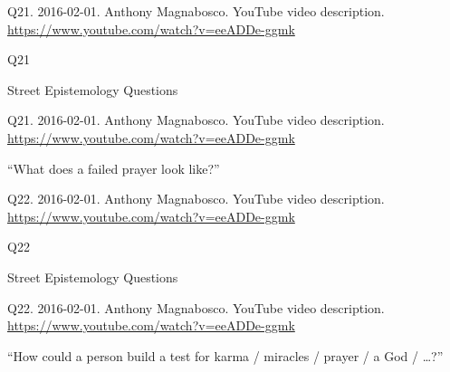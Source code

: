 \documentclass[
    src/templates/5x2-on-a4paper,
    frame
]{flashcards}
\newcommand{\myheader}{}
\newcommand{\myfooter}{
    \begin{flushright}
        \small\sc
        Street Epistemology Questions \par
    \end{flushright}
}
\begin{document}
        \renewcommand{\myheader}{
            \normalfont %
            \begin{tiny}
                Q21.
                2016-02-01.
                Anthony Magnabosco.
                    YouTube video description.
                    \\
                    \url{ https://www.youtube.com/watch?v=eeADDe-ggmk }
                \par
            \end{tiny}
        }
        \begin{flashcard}{
            \myheader
            \vspace{\fill}
            \begin{center}
                \large
                    Q21
            \end{center}
            \vspace{\fill}
            \myfooter
            \vspace{-1.4ex}
        }
            \myheader
            \vspace{\fill}
            \begin{center}
                \large
\enquote{What does a failed prayer look like?}            \end{center}
            \vspace{\fill}
        \end{flashcard}
        \renewcommand{\myheader}{
            \normalfont %
            \begin{tiny}
                Q22.
                2016-02-01.
                Anthony Magnabosco.
                    YouTube video description.
                    \\
                    \url{ https://www.youtube.com/watch?v=eeADDe-ggmk }
                \par
            \end{tiny}
        }
        \begin{flashcard}{
            \myheader
            \vspace{\fill}
            \begin{center}
                \large
                    Q22
            \end{center}
            \vspace{\fill}
            \myfooter
            \vspace{-1.4ex}
        }
            \myheader
            \vspace{\fill}
            \begin{center}
                \large
\enquote{How could a person build a test for karma / miracles / prayer / a God / …?}            \end{center}
            \vspace{\fill}
        \end{flashcard}
\end{document}
